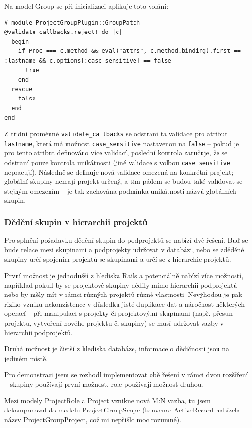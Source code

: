 \documentclass[thesis=B,czech]{FITthesis}[2012/05/02]
\begin{document}
Na model Group se při inicializaci aplikuje toto volání:

\begin{lstlisting}
# module ProjectGroupPlugin::GroupPatch
@validate_callbacks.reject! do |c|
  begin
    if Proc === c.method && eval("attrs", c.method.binding).first == :lastname && c.options[:case_sensitive] == false
      true
    end
  rescue
    false
  end
end
\end{lstlisting}
Z třídní proměnné \lstinline!validate_callbacks! se odstraní ta validace
pro atribut \lstinline!lastname!, která má možnost
\lstinline!case_sensitive! nastavenou na \lstinline!false! -- pokud je pro
tento atribut definováno více validací, poslední kontrola zaručuje, že
se odstraní pouze kontrola unikátnosti (jiné validace s volbou
\lstinline!case_sensitive! nepracují). Následně se definuje nová
validace omezená na konkrétní projekt; globální skupiny nemají projekt
určený, a tím pádem se budou také validovat se stejným omezením -- je tak
zachována podmínka unikátnosti názvů globálních skupin.

\subsubsection{Dědění skupin v hierarchii projektů}
\label{sec:proj_group_inherit}

Pro splnění požadavku dědění skupin do podprojektů se nabízí dvě
řešení. Buď se bude relace mezi skupinami a podprojekty udržovat
v databázi, nebo se zděděné skupiny určí spojením projektů se skupinami a
určí se z hierarchie projektů.

První možnost je jednodušší z hlediska Rails a potenciálně nabízí více
možností, například pokud by se projektové skupiny dědily mimo
hierarchii podprojektů nebo by měly mít v rámci různých projektů různé
vlastnosti. Nevýhodou je pak riziko vzniku nekonzistence v důsledku
jisté duplikace dat a náročnost některých operací -- při manipulaci
s projekty či projektovými skupinami (např. přesun projektu, vytvoření
nového projektu či skupiny) se musí udržovat vazby v hierarchii
podprojektů.

Druhá možnost je čistší z hlediska databáze, informace o dědičnosti jsou
na jediném místě.

Pro demonstraci jsem se rozhodl implementovat obě řešení v rámci dvou
rozšíření -- skupiny používají první možnost, role používají možnost
druhou.

Mezi modely ProjectRole a Project vznikne nová M:N vazba, tu jsem
dekomponoval do modelu ProjectGroupScope (konvence ActiveRecord nabízela
název ProjectGroupProject, což mi nepřišlo moc rozumné).
\end{document}
